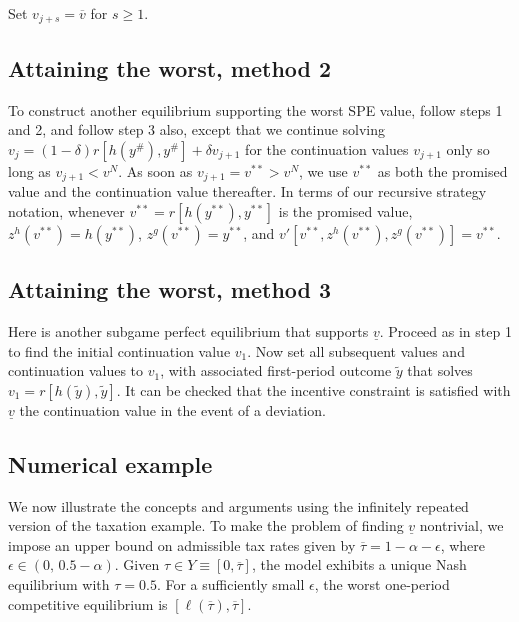 \smallskip
{} Set $v_{j+s} = \overline v$ for $s\geq 1$.

\subsection{Attaining the worst, method 2}
To construct another equilibrium supporting
the worst SPE value, follow steps
1 and 2, and follow step 3 also, except that
we continue solving
$v_j = (1-\delta) r [ h(y^\#), y^\#] + \delta v_{j+1}$
for the continuation values $v_{j+1}$ only so long as $v_{j+1} <  v^N$.
As soon as $v_{j+1} = v^{**} > v^N$, we use $v^{**}$ as both the
promised value and
the continuation value thereafter.  In terms of our recursive
strategy notation, whenever $v^{**}
= r [h(y^{**}),y^{**}]$ is
the promised value, $z^h(v^{**})= h(y^{**})$, $z^g(v^{**})= y^{**}$,
and $v'[v^{**}, z^h(v^{**}), z^g(v^{**})]=v^{**}$.

\subsection{Attaining the worst, method 3}
Here is another subgame perfect equilibrium that supports $\underline v$.
Proceed as in step 1 to find the initial continuation value $v_1$.  Now
set all subsequent values and  continuation values to $v_1$,
with associated first-period outcome $\tilde y$ that solves
$v_1 = r [h(\tilde y),\tilde y]$.  It can be checked that the
incentive constraint is satisfied with $\underline v$ the
continuation value in the event of a deviation.








\subsection{Numerical example}
We now illustrate the concepts and arguments using the infinitely
repeated version of the taxation example. To make the problem of
finding $\underline v$ nontrivial, we impose an upper bound on
admissible tax rates given by $\overline \tau=1-\alpha-\epsilon$, where
$\epsilon\in (0,\, 0.5-\alpha)$. Given
$\tau\in Y \equiv [0, \overline \tau]$,
the model exhibits a unique Nash equilibrium with $\tau=0.5$.
For a sufficiently small $\epsilon$, the worst one-period
competitive equilibrium is $[\ell(\overline \tau), \overline \tau]$.

